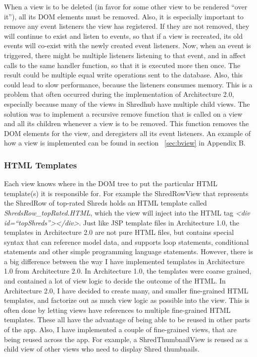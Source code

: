 When a view is to be deleted (in favor for some other view to be rendered ``over it''), all its DOM elements must be removed. Also, it is especially important to remove any event listeners the view has registered. If they are not removed, they will continue to exist and listen to events, so that if a view is recreated, its old events will co-exist with the newly created event listeners. Now, when an event is triggered, there might be multiple listeners listening to that event, and in affect calls to the same handler function, so that it is executed more then once. The result could be multiple equal write operations sent to the database. Also, this could lead to slow performance, because the listeners consumes memory. This is a problem that often occurred during the implementation of Architecture 2.0, especially because many of the views in Shredhub have multiple child views. The solution was to implement a recursive remove function that is called on a view and all its children whenever a view is to be removed. This function removes the DOM elements for the view, and deregisters all its event listeners. An example of how a view is implemented can be found in section ~\ref{sec:bview} in  Appendix B. 


\subsubsection{HTML Templates}
Each view knows where in the DOM tree to put the particular HTML template(s) it is responsible for. For example the ShredRowView that represents the ShredRow of top-rated Shreds holds an HTML template called \textit{ShredsRow\_topRated.HTML}, which the view will inject into the HTML tag \textit{<div id=``topShreds''></div>}. Just like JSP template files in Architecture 1.0, the templates in Architecture 2.0 are not pure HTML files, but contains special syntax that can reference model data, and supports loop statements, conditional statements and other simple programming language statements. However, there is a big difference between the way I have implemented templates in Architecture 1.0 from Architecture 2.0. In Architecture 1.0, the templates were coarse grained, and contained a lot of view logic to decide the outcome of the HTML. In Architecture 2.0, I have decided to create many, and smaller fine-grained HTML templates, and factorize out as much view logic as possible into the view. This is often done by letting views have references to multiple fine-grained HTML templates. These all have the advantage of being able to be reused in other parts of the app. Also, I have implemented a couple of fine-grained views, that are being  reused across the app. For example, a ShredThumbnailView is reused as a child view of other views who need to display Shred thumbnails. 

